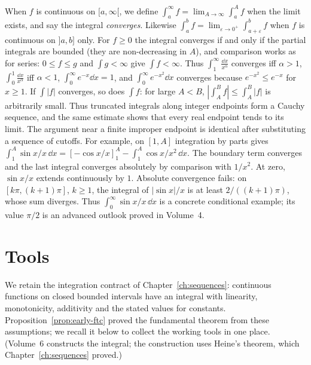\begin{reminder}
When $f$ is continuous on $[a,\infty[$, we define $\int_a^\infty f=\lim_{A\to\infty}\int_a^Af$ when the limit exists, and say the integral \emph{converges}. Likewise $\int_a^bf=\lim_{\varepsilon\to0^+}\int_{a+\varepsilon}^bf$ when $f$ is continuous on $]a,b]$ only. For $f\ge0$ the integral converges if and only if the partial integrals are bounded (they are non-decreasing in $A$), and comparison works as for series: $0\le f\le g$ and $\int g<\infty$ give $\int f<\infty$. Thus $\int_1^\infty\frac{\dd x}{x^\alpha}$ converges iff $\alpha>1$, $\int_0^1\frac{\dd x}{x^\alpha}$ iff $\alpha<1$, $\int_0^\infty e^{-x}\dd x=1$, and $\int_0^\infty e^{-x^2}\dd x$ converges because $e^{-x^2}\le e^{-x}$ for $x\ge1$. If $\int|f|$ converges, so does $\int f$: for large $A<B$,
$|\int_A^B f|\le\int_A^B|f|$ is arbitrarily small. Thus truncated integrals
along integer endpoints form a Cauchy sequence, and the same estimate shows
that every real endpoint tends to its limit. The argument near a finite
improper endpoint is identical after substituting a sequence of cutoffs. For example, on $[1,A]$ integration by parts gives
$\int_1^A\sin x/x\,\dd x=[-\cos x/x]_1^A-\int_1^A\cos x/x^2\,\dd x$.
The boundary term converges and the last integral converges absolutely by comparison
with $1/x^2$. At zero, $\sin x/x$ extends continuously by $1$.
Absolute convergence fails: on $[k\pi,(k+1)\pi]$, $k\ge1$, the integral of
$|\sin x|/x$ is at least $2/((k+1)\pi)$, whose sum diverges.
Thus $\int_0^\infty\sin x/x\,\dd x$ is a concrete conditional example;
its value $\pi/2$ is an advanced outlook proved in Volume~4.
\end{reminder}

\section{Tools}

We retain the integration contract of Chapter~\ref{ch:sequences}: continuous
functions on closed bounded intervals have an integral with linearity,
monotonicity, additivity and the stated values for constants.
Proposition~\ref{prop:early-ftc} proved the fundamental theorem from these
assumptions; we recall it below to collect the working tools in one place. (Volume~6 constructs the integral; the construction uses Heine's theorem, which Chapter~\ref{ch:sequences} proved.)

